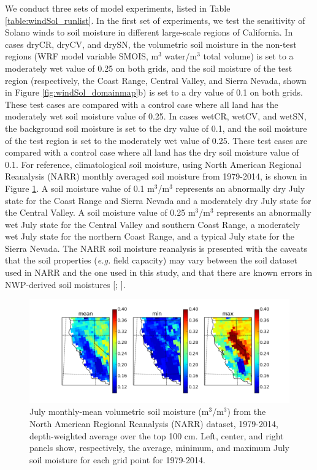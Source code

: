 We conduct three sets of model experiments, listed in Table \ref{table:windSol_runlist}.  In the first set of experiments, we test the sensitivity of Solano winds to soil moisture in different large-scale regions of California.  In cases dryCR, dryCV, and drySN, the volumetric soil moisture in the non-test regions (WRF model variable SMOIS, m$^3$ water/m$^3$ total volume) is set to a moderately wet value of 0.25 on both grids, and the soil moisture of the test region (respectively, the Coast Range, Central Valley, and Sierra Nevada, shown in Figure \ref{fig:windSol_domainmap}b) is set to a dry value of 0.1 on both grids.  These test cases are compared with a control case where all land has the moderately wet soil moisture value of 0.25.  In cases wetCR, wetCV, and wetSN, the background soil moisture is set to the dry value of 0.1, and the soil moisture of the test region is set to the moderately wet value of 0.25.  These test cases are compared with a control case where all land has the dry soil moisture value of 0.1.  For reference, climatological soil moisture, using North American Regional Reanalysis (NARR) monthly averaged soil moisture from 1979-2014, is shown in Figure \ref{fig:windSol_NARR_smois}.  A soil moisture value of 0.1 m$^3$/m$^3$  represents an abnormally dry July state for the Coast Range and Sierra Nevada and a moderately dry July state for the Central Valley.  A soil moisture value of 0.25 m$^3$/m$^3$  represents an abnormally wet July state for the Central Valley and southern Coast Range, a moderately wet July state for the northern Coast Range, and a typical July state for the Sierra Nevada.  The NARR soil moisture reanalysis is presented with the caveats that the soil properties (\textit{e.g.} field capacity) may vary between the soil dataset used in NARR and the one used in this study, and that there are known errors in NWP-derived soil moistures [\cite{marshall2003impact}; \cite{godfrey2008soil}].

\begin{figure}[here]
\includegraphics[width=1\textwidth]{ch3-wind/img/NARR_smois_maps_3.png}
\caption{July monthly-mean volumetric soil moisture (m$^3$/m$^3$) from the North American Regional Reanalysis (NARR) dataset, 1979-2014, depth-weighted average over the top 100 cm.  Left, center, and right panels show, respectively, the average, minimum, and maximum July soil moisture for each grid point for 1979-2014.}
\label{fig:windSol_NARR_smois}
\end{figure}

